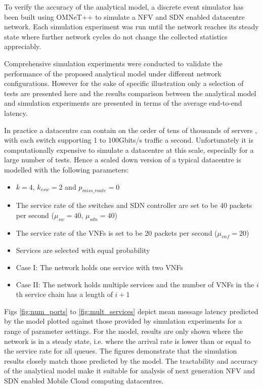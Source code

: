 To verify the accuracy of the analytical model, a discrete event simulator has been built using OMNeT++ \cite{VargaH08} to simulate a NFV and SDN enabled datacentre network. Each simulation experiment was run until the network reaches its steady state where further network cycles do not change the collected statistics appreciably.

Comprehensive simulation experiments were conducted to validate the performance of the proposed analytical model under different network configurations. However for the sake of specific illustration only a selection of tests are presented here and the results comparison between the analytical model and simulation experiments are presented in terms of the average end-to-end latency.

In practice a datacentre can contain on the order of tens of thousands of servers \cite{AWS16}, with each switch supporting 1 to 100Gbits/s traffic a second. Unfortunately it is computationally expensive to simulate a datacentre at this scale, especially for a large number of tests. Hence a scaled down version of a typical datacentre is modelled with the following parameters:

\begin{itemize}
\item $k = 4$, $k_{vsw} = 2$ and $p_{miss\_route} = 0$
\item The service rate of the switches and SDN controller are set to be 40 packets per second ($\mu_{sw} = 40$, $\mu_{sdn} = 40$)
\item The service rate of the VNFs is set to be 20 packets per second ($\mu_{vnf} = 20$)
\item Services are selected with equal probability
\item Case I: The network holds one service with two VNFs
\item Case II: The network holds multiple services and the number of VNFs in the $i$th service chain has a length of $i+1$
\end{itemize}

Figs \ref{fig:num_ports} to \ref{fig:mult_services} depict mean message latency predicted by the model plotted against those provided by simulation experiments for a range of parameter settings. For the model, results are only shown where the network is in a steady state, i.e. where the arrival rate is lower than or equal to the service rate for all queues. The figures demonstrate that the simulation results closely match those predicted by the model. The tractability and accuracy of the analytical model make it suitable for analysis of next generation NFV and SDN enabled Mobile Cloud computing datacentres.